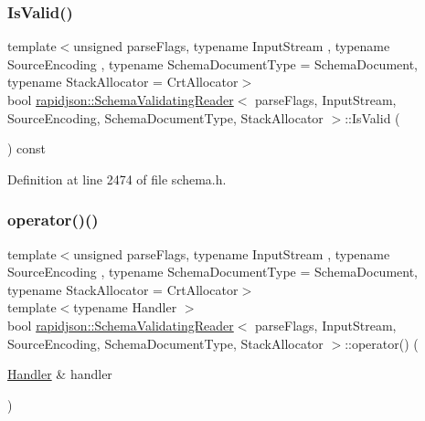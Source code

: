 \subsubsection{\texorpdfstring{IsValid()}{IsValid()}}
{\footnotesize\ttfamily template$<$unsigned parse\+Flags, typename Input\+Stream , typename Source\+Encoding , typename Schema\+Document\+Type  = Schema\+Document, typename Stack\+Allocator  = Crt\+Allocator$>$ \\
bool \mbox{\hyperlink{classrapidjson_1_1_schema_validating_reader}{rapidjson\+::\+Schema\+Validating\+Reader}}$<$ parse\+Flags, Input\+Stream, Source\+Encoding, Schema\+Document\+Type, Stack\+Allocator $>$\+::Is\+Valid (\begin{DoxyParamCaption}{ }\end{DoxyParamCaption}) const}



Definition at line 2474 of file schema.\+h.


\begin{DoxyCode}{0}

\end{DoxyCode}
\mbox{\label{classrapidjson_1_1_schema_validating_reader_adb09230cc40b8dc5ba607de14d37dc42}} 
\subsubsection{\texorpdfstring{operator()()}{operator()()}}
{\footnotesize\ttfamily template$<$unsigned parse\+Flags, typename Input\+Stream , typename Source\+Encoding , typename Schema\+Document\+Type  = Schema\+Document, typename Stack\+Allocator  = Crt\+Allocator$>$ \\
template$<$typename Handler $>$ \\
bool \mbox{\hyperlink{classrapidjson_1_1_schema_validating_reader}{rapidjson\+::\+Schema\+Validating\+Reader}}$<$ parse\+Flags, Input\+Stream, Source\+Encoding, Schema\+Document\+Type, Stack\+Allocator $>$\+::operator() (\begin{DoxyParamCaption}\item[{\mbox{\hyperlink{classrapidjson_1_1_handler}{Handler}} \&}]{handler }\end{DoxyParamCaption})}



